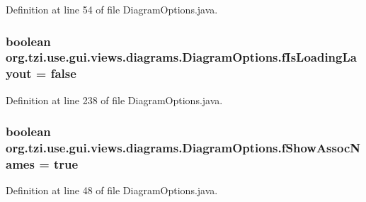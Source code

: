 Definition at line 54 of file Diagram\-Options.\-java.

\hypertarget{classorg_1_1tzi_1_1use_1_1gui_1_1views_1_1diagrams_1_1_diagram_options_a341d5b989ea29492481c993031619670}{
\subsubsection[{f\-Is\-Loading\-Layout}]{\setlength{\rightskip}{0pt plus 5cm}boolean org.\-tzi.\-use.\-gui.\-views.\-diagrams.\-Diagram\-Options.\-f\-Is\-Loading\-Layout = false\hspace{0.3cm}{\ttfamily [protected]}}}\label{classorg_1_1tzi_1_1use_1_1gui_1_1views_1_1diagrams_1_1_diagram_options_a341d5b989ea29492481c993031619670}


Definition at line 238 of file Diagram\-Options.\-java.

\hypertarget{classorg_1_1tzi_1_1use_1_1gui_1_1views_1_1diagrams_1_1_diagram_options_a39117f5d32b8f542e5f44b600ba9190e}{
\subsubsection[{f\-Show\-Assoc\-Names}]{\setlength{\rightskip}{0pt plus 5cm}boolean org.\-tzi.\-use.\-gui.\-views.\-diagrams.\-Diagram\-Options.\-f\-Show\-Assoc\-Names = true\hspace{0.3cm}{\ttfamily [protected]}}}\label{classorg_1_1tzi_1_1use_1_1gui_1_1views_1_1diagrams_1_1_diagram_options_a39117f5d32b8f542e5f44b600ba9190e}


Definition at line 48 of file Diagram\-Options.\-java.

